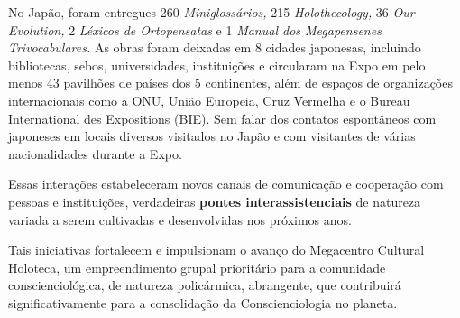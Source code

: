 \documentclass{gescons}
\begin{document}
No Japão, foram entregues 260 \emph{Miniglossários,} 215 \emph{Holothecology,} 36 \emph{Our Evolution,} 2 \emph{Léxicos de Ortopensatas} e 1 \emph{Manual dos Megapensenes Trivocabulares.} As obras foram deixadas em 8 cidades japonesas, incluindo bibliotecas, sebos, universidades, instituições e circularam na Expo em pelo menos 43 pavilhões de países dos 5 continentes, além de espaços de organizações internacionais como a ONU, União Europeia, Cruz Vermelha e o Bureau International des Expositions (BIE). Sem falar dos contatos espontâneos com japoneses em locais diversos visitados no Japão e com visitantes de várias nacionalidades durante a Expo.

Essas interações estabeleceram novos canais de comunicação e cooperação com pessoas e instituições, verdadeiras \textbf{pontes interassistenciais} de natureza variada a serem cultivadas e desenvolvidas nos próximos anos.

Tais iniciativas fortalecem e impulsionam o avanço do Megacentro Cultural Holoteca, um empreendimento grupal prioritário para a comunidade conscienciológica, de natureza policármica, abrangente, que contribuirá significativamente para a consolidação da Conscienciologia no planeta.


        
\end{document}

